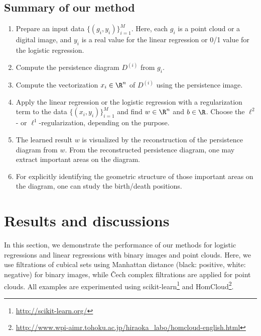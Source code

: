 \documentclass[smallextended]{svjour3}
\begin{document}
\subsection{Summary of our method}

\begin{enumerate}
\item Prepare an input data $\{(g_i, y_i)\}_{i=1}^M$. Here, each $g_i$ is a point cloud or a digital image, and $y_i$ is a real value for the linear regression or 0/1 value for the logistic regression.
\item Compute the persistence diagram $D^{(i)}$ from $g_i$.
\item Compute the vectorization $x_i \in \R^n$ of $D^{(i)}$ using the persistence image. 
\item Apply the linear regression or the logistic regression with a regularization term to the data $\{(x_i, y_i)\}_{i=1}^M$ and find $w \in \R^n$ and $b \in \R$.
Choose the $\ell^2$- or $\ell^1$-regularization, depending on the purpose. 
\item The learned result $w$ is visualized by the reconstruction of the persistence diagram from $w$.
From the reconstructed persistence diagram, one may extract important areas on the diagram. 
\item For explicitly identifying the geometric structure of those important areas on the diagram, one can study the birth/death positions. 
\end{enumerate}






\section{Results and discussions}\label{sec:result}
In this section, we demonstrate the performance of our methods for logistic regressions and linear regressions with binary images and point clouds. 
Here, we use filtrations of cubical sets using Manhattan distance (black: positive, white: negative) for binary images, while {\v C}ech  complex filtrations are applied for point clouds. All examples are experimented using scikit-learn\footnote{\url{http://scikit-learn.org/}} and  HomCloud\footnote{\url{http://www.wpi-aimr.tohoku.ac.jp/hiraoka_labo/homcloud-english.html}}.
 
\end{document}
